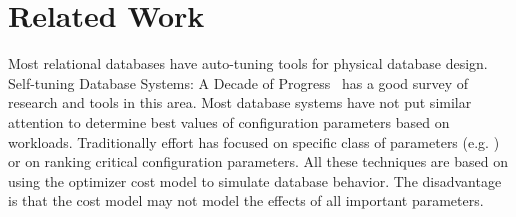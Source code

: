 \section{Related Work}
\label{sec:relatedwork}
Most relational databases have auto-tuning tools for physical database design. 
Self-tuning Database Systems: A Decade of Progress~\cite{Chaudhuri}
 has a good survey of research and tools in this area. Most database systems have 
not put similar attention to determine best values of configuration parameters 
based on workloads. Traditionally effort has focused on specific class of parameters 
(e.g.\cite{Storm} ) or on ranking
critical configuration parameters\cite{DebnathLM08}. All these techniques
are based on using the optimizer cost model to simulate database behavior. The disadvantage is
that the cost model may not model the effects of all important parameters.

